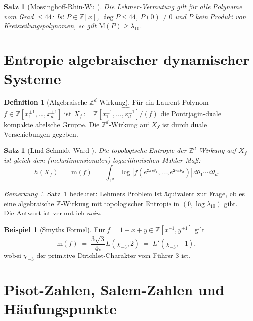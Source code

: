 \documentclass[12pt,a4paper]{amsart}
\newtheorem{satz}[theorem]{Satz}
\theoremstyle{definition}
\newtheorem{definition_de}[theorem]{Definition}
\newtheorem{example}[theorem]{Beispiel}
\theoremstyle{remark}
\newtheorem{bemerkung}[theorem]{Bemerkung}
\newcommand{\Z}{\mathbb{Z}}
\newcommand{\T}{\mathbb{T}}
\newcommand{\M}{\mathrm{M}}
\newcommand{\m}{\mathrm{m}}
\begin{document}
\begin{satz}[Mossinghoff-Rhin-Wu \cite{MRW2008}]
  Die Lehmer-Vermutung gilt für alle Polynome vom Grad $\leq 44$:
  Ist $P \in \Z[x]$, $\deg P \leq 44$, $P(0) \neq 0$ und $P$ kein Produkt von
  Kreisteilungspolynomen, so gilt $\M(P) \geq \lambda_{10}$.
\end{satz}

\section{Entropie algebraischer dynamischer Systeme}\label{sec:entropie}

\begin{definition_de}[Algebraische $\Z^d$-Wirkung]
  Für ein Laurent-Polynom $f \in \Z[x_1^{\pm 1},\ldots,x_d^{\pm 1}]$ ist
  $X_f := \widehat{\Z[x_1^{\pm 1},\ldots,x_d^{\pm 1}]/(f)}$
  die Pontrjagin-duale kompakte abelsche Gruppe.
  Die $\Z^d$-Wirkung auf $X_f$ ist durch duale Verschiebungen gegeben.
\end{definition_de}

\begin{satz}[Lind-Schmidt-Ward \cite{LSW1990}]\label{satz:lsw}
  Die topologische Entropie der $\Z^d$-Wirkung auf $X_f$ ist gleich dem
  (mehrdimensionalen) logarithmischen Mahler-Maß:
  \[
    h(X_f) \;=\; \m(f) \;=\; \int_{\T^d} \log|f(e^{2\pi i \theta_1},\ldots,e^{2\pi i \theta_d})|\,
    d\theta_1 \cdots d\theta_d.
  \]
\end{satz}

\begin{bemerkung}
  Satz~\ref{satz:lsw} bedeutet: Lehmers Problem ist äquivalent zur Frage, ob es eine
  algebraische $\Z$-Wirkung mit topologischer Entropie in $(0, \log\lambda_{10})$ gibt.
  Die Antwort ist vermutlich \emph{nein}.
\end{bemerkung}

\begin{example}[Smyths Formel]
  Für $f = 1 + x + y \in \Z[x^{\pm 1}, y^{\pm 1}]$ gilt
  \[
    \m(f) \;=\; \frac{3\sqrt{3}}{4\pi} L(\chi_{-3}, 2)
           \;=\; L'(\chi_{-3}, -1),
  \]
  wobei $\chi_{-3}$ der primitive Dirichlet-Charakter vom Führer $3$ ist.
\end{example}

\section{Pisot-Zahlen, Salem-Zahlen und Häufungspunkte}\label{sec:pisot}
\end{document}
